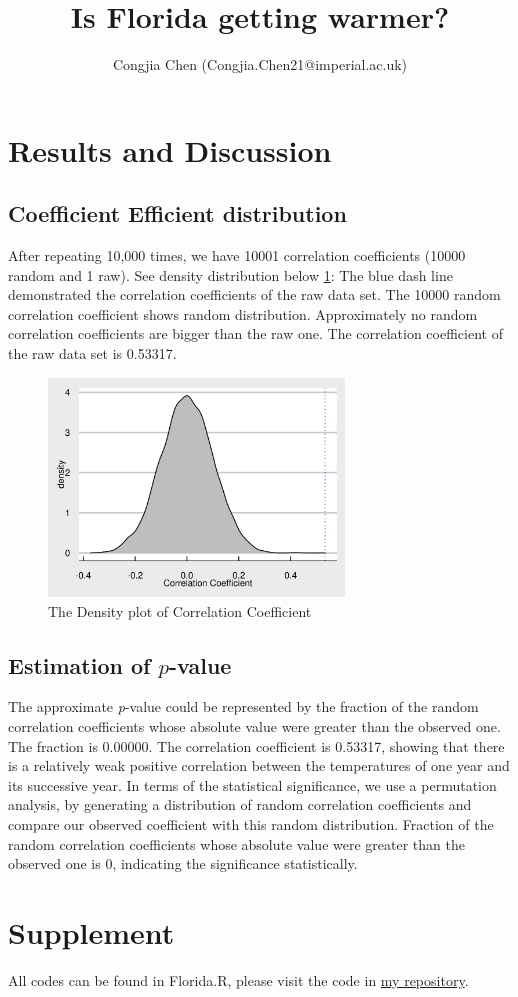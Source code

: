 \documentclass{article}
\title{Is Florida getting warmer?}
\author{Congjia Chen (Congjia.Chen21@imperial.ac.uk)}
\begin{document}
\maketitle

\section{Results and Discussion}

\subsection{Coefficient Efficient distribution}
After repeating 10,000 times, we have 10001 correlation coefficients (10000 random and 1 raw). See density distribution below \ref{fig:Density_plot}:
The blue dash line demonstrated the correlation coefficients of the raw data set. The 10000 random correlation coefficient shows random distribution. Approximately no random correlation coefficients are bigger than the raw one. The correlation coefficient of the raw data set is 0.53317.
\begin{figure}[H]
\centering
\includegraphics[width=0.7\textwidth]{Density_plot.png}
\caption{\label{fig:Density_plot}The Density plot of Correlation Coefficient}
\end{figure}

\subsection{Estimation of \texorpdfstring{$\mathit{p}$}{}-value}
The approximate \textit{p}-value could be represented by the fraction of the random correlation coefficients whose absolute value were greater than the observed one. The fraction is 0.00000.
The correlation coefficient is 0.53317, showing that there is a relatively weak positive correlation between the temperatures of one year and its successive year. In terms of the statistical significance, we use a permutation analysis, by generating a distribution of random correlation coefficients and compare our observed coefficient with this random distribution. Fraction of the random correlation coefficients whose absolute value were greater than the observed one is 0, indicating the significance statistically.

\section{Supplement}
  All codes can be found in Florida.R, please visit the code in \href{https://github.com/nedchen2/CMEECourseWork/blob/master/week3/code/Florida_warming.R}{my repository}.
\end{document}
